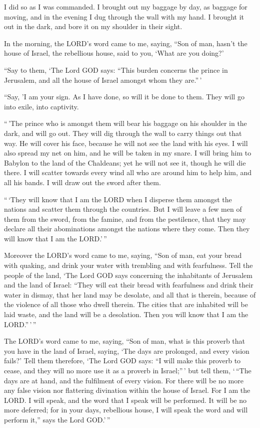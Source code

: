  I did so as I was commanded. I brought out my baggage by
day, as baggage for moving, and in the evening I dug through the wall
with my hand. I brought it out in the dark, and bore it on my shoulder
in their sight.

 In the morning, the LORD's word came to me, saying,
 ``Son of man, hasn't the house of Israel, the rebellious
house, said to you, `What are you doing?'

 ``Say to them, `The Lord GOD says: ``This burden
concerns the prince in Jerusalem, and all the house of Israel amongst
whom they are.''\,'

 ``Say, 'I am your sign. As I have done, so will it be
done to them. They will go into exile, into captivity.

 ``\,'The prince who is amongst them will bear his
baggage on his shoulder in the dark, and will go out. They will dig
through the wall to carry things out that way. He will cover his face,
because he will not see the land with his eyes.  I will
also spread my net on him, and he will be taken in my snare. I will
bring him to Babylon to the land of the Chaldeans; yet he will not see
it, though he will die there.  I will scatter towards
every wind all who are around him to help him, and all his bands. I will
draw out the sword after them.

 ``\,`They will know that I am the LORD when I disperse
them amongst the nations and scatter them through the countries.
 But I will leave a few men of them from the sword, from
the famine, and from the pestilence, that they may declare all their
abominations amongst the nations where they come. Then they will know
that I am the LORD.'\,''

 Moreover the LORD's word came to me, saying,
 ``Son of man, eat your bread with quaking, and drink
your water with trembling and with fearfulness.  Tell the
people of the land, `The Lord GOD says concerning the inhabitants of
Jerusalem and the land of Israel: ``They will eat their bread with
fearfulness and drink their water in dismay, that her land may be
desolate, and all that is therein, because of the violence of all those
who dwell therein.  The cities that are inhabited will be
laid waste, and the land will be a desolation. Then you will know that I
am the LORD.''\,'\,''

 The LORD's word came to me, saying, 
``Son of man, what is this proverb that you have in the land of Israel,
saying, `The days are prolonged, and every vision fails?'
 Tell them therefore, `The Lord GOD says: ``I will make
this proverb to cease, and they will no more use it as a proverb in
Israel;''\,' but tell them, `\,``The days are at hand, and the
fulfilment of every vision.  For there will be no more
any false vision nor flattering divination within the house of Israel.
 For I am the LORD. I will speak, and the word that I
speak will be performed. It will be no more deferred; for in your days,
rebellious house, I will speak the word and will perform it,'' says the
Lord GOD.'\,''

